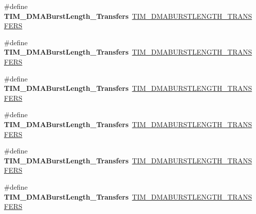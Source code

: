 \begin{DoxyCompactItemize}
\#define {\bfseries T\+I\+M\+\_\+\+D\+M\+A\+Burst\+Length\+\_\+Transfers}~\hyperlink{group___t_i_m___d_m_a___burst___length_ga9ada9605ae6ff6e4ada9701263bef812}{T\+I\+M\+\_\+\+D\+M\+A\+B\+U\+R\+S\+T\+L\+E\+N\+G\+T\+H\+\_\+T\+R\+A\+N\+S\+F\+E\+RS}
\item 
\mbox{\label{group___h_a_l___t_i_m___aliased___defines_ga44f8aa51fbe8887a5f3c37a0e776902c}} 
\#define {\bfseries T\+I\+M\+\_\+\+D\+M\+A\+Burst\+Length\+\_\+Transfers}~\hyperlink{group___t_i_m___d_m_a___burst___length_ga740a6446c0a517cc3e235fddee45fef5}{T\+I\+M\+\_\+\+D\+M\+A\+B\+U\+R\+S\+T\+L\+E\+N\+G\+T\+H\+\_\+T\+R\+A\+N\+S\+F\+E\+RS}
\item 
\mbox{\label{group___h_a_l___t_i_m___aliased___defines_ga8be40a21654eea72e9c1bf9922675b22}} 
\#define {\bfseries T\+I\+M\+\_\+\+D\+M\+A\+Burst\+Length\+\_\+Transfers}~\hyperlink{group___t_i_m___d_m_a___burst___length_ga905c206d2a028e3fb92bcab8f9f7c869}{T\+I\+M\+\_\+\+D\+M\+A\+B\+U\+R\+S\+T\+L\+E\+N\+G\+T\+H\+\_\+T\+R\+A\+N\+S\+F\+E\+RS}
\item 
\mbox{\label{group___h_a_l___t_i_m___aliased___defines_gaf2ae83bd73b0e92b73e5ebfc11f9bfad}} 
\#define {\bfseries T\+I\+M\+\_\+\+D\+M\+A\+Burst\+Length\+\_\+Transfers}~\hyperlink{group___t_i_m___d_m_a___burst___length_gae75055ac13b73baf9326f1d6157853a7}{T\+I\+M\+\_\+\+D\+M\+A\+B\+U\+R\+S\+T\+L\+E\+N\+G\+T\+H\+\_\+T\+R\+A\+N\+S\+F\+E\+RS}
\item 
\mbox{\label{group___h_a_l___t_i_m___aliased___defines_ga8a760d7114425596736b0ecdbe5fdea6}} 
\#define {\bfseries T\+I\+M\+\_\+\+D\+M\+A\+Burst\+Length\+\_\+Transfers}~\hyperlink{group___t_i_m___d_m_a___burst___length_gac6b24f5b7d9e1968b4bfcaeb24e718fc}{T\+I\+M\+\_\+\+D\+M\+A\+B\+U\+R\+S\+T\+L\+E\+N\+G\+T\+H\+\_\+T\+R\+A\+N\+S\+F\+E\+RS}
\item 
\mbox{\label{group___h_a_l___t_i_m___aliased___defines_ga98b208205c133557a9d67a0921559a66}} 
\#define {\bfseries T\+I\+M\+\_\+\+D\+M\+A\+Burst\+Length\+\_\+Transfers}~\hyperlink{group___t_i_m___d_m_a___burst___length_ga73fff75a3f0247c61a84a42e8cb83572}{T\+I\+M\+\_\+\+D\+M\+A\+B\+U\+R\+S\+T\+L\+E\+N\+G\+T\+H\+\_\+T\+R\+A\+N\+S\+F\+E\+RS}

\end{DoxyCompactItemize}

